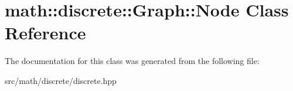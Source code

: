\hypertarget{classmath_1_1discrete_1_1Graph_1_1Node}{
\section{math::discrete::Graph::Node Class Reference}
\label{classmath_1_1discrete_1_1Graph_1_1Node}
}


The documentation for this class was generated from the following file:\begin{DoxyCompactItemize}
\item 
src/math/discrete/discrete.hpp\end{DoxyCompactItemize}
